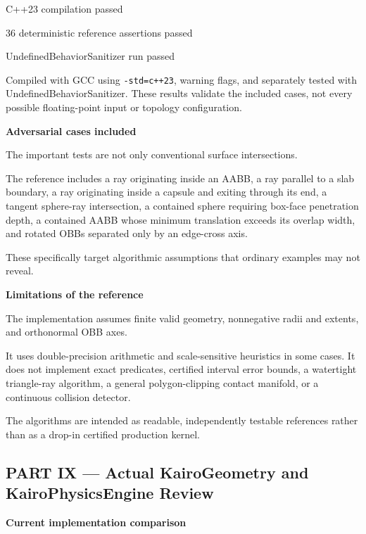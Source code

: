 C++23 compilation passed

36 deterministic reference assertions passed

UndefinedBehaviorSanitizer run passed

Compiled with GCC using \texttt{-std=c++23}, warning flags, and separately tested with UndefinedBehaviorSanitizer. These results validate the included cases, not every possible floating-point input or topology configuration.

\textbf{Adversarial cases included}

The important tests are not only conventional surface intersections.

The reference includes a ray originating inside an AABB, a ray parallel to a slab boundary, a ray originating inside a capsule and exiting through its end, a tangent sphere-ray intersection, a contained sphere requiring box-face penetration depth, a contained AABB whose minimum translation exceeds its overlap width, and rotated OBBs separated only by an edge-cross axis.

These specifically target algorithmic assumptions that ordinary examples may not reveal.

\textbf{Limitations of the reference}

The implementation assumes finite valid geometry, nonnegative radii and extents, and orthonormal OBB axes.

It uses double-precision arithmetic and scale-sensitive heuristics in some cases. It does not implement exact predicates, certified interval error bounds, a watertight triangle-ray algorithm, a general polygon-clipping contact manifold, or a continuous collision detector.

The algorithms are intended as readable, independently testable references rather than as a drop-in certified production kernel.

\subsection{PART IX --- Actual KairoGeometry and KairoPhysicsEngine Review}\label{04-visual-computing-ii-ch025-part-ix-actual-kairogeometry-and-kairophysicsengine-review}

\textbf{Current implementation comparison}

